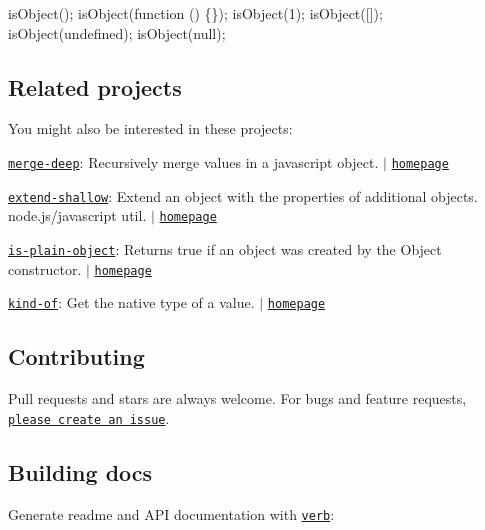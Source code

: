 \begin{DoxyCode}
isObject();
isObject(function () \{\});
isObject(1);
isObject([]);
isObject(undefined);
isObject(null);
\end{DoxyCode}


\subsection*{Related projects}

You might also be interested in these projects\+:

\href{https://www.npmjs.com/package/merge-deep}{\tt merge-\/deep}\+: Recursively merge values in a javascript object. $\vert$ \href{https://github.com/jonschlinkert/merge-deep}{\tt homepage}


\begin{DoxyItemize}
\item \href{https://www.npmjs.com/package/extend-shallow}{\tt extend-\/shallow}\+: Extend an object with the properties of additional objects. node.\+js/javascript util. $\vert$ \href{https://github.com/jonschlinkert/extend-shallow}{\tt homepage}
\item \href{https://www.npmjs.com/package/is-plain-object}{\tt is-\/plain-\/object}\+: Returns true if an object was created by the {\ttfamily Object} constructor. $\vert$ \href{https://github.com/jonschlinkert/is-plain-object}{\tt homepage}
\item \href{https://www.npmjs.com/package/kind-of}{\tt kind-\/of}\+: Get the native type of a value. $\vert$ \href{https://github.com/jonschlinkert/kind-of}{\tt homepage}
\end{DoxyItemize}

\subsection*{Contributing}

Pull requests and stars are always welcome. For bugs and feature requests, \href{https://github.com/jonschlinkert/isobject/issues/new}{\tt please create an issue}.

\subsection*{Building docs}

Generate readme and A\+PI documentation with \href{https://github.com/verbose/verb}{\tt verb}\+:




